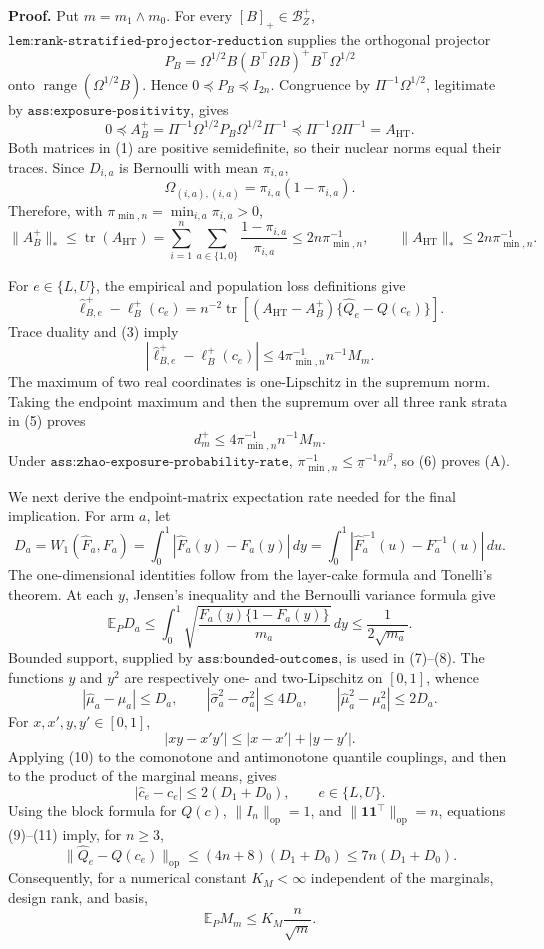\textbf{Proof.}
Put \(m=m_1\wedge m_0\).  For every \([B]_+\in\mathcal B_Z^+\), \(\texttt{lem:rank-stratified-projector-reduction}\) supplies the orthogonal projector
\[
P_B=\Omega^{1/2}B(B^{\top}\Omega B)^+B^{\top}\Omega^{1/2}
\]
onto \(\operatorname{range}(\Omega^{1/2}B)\).  Hence \(0\preceq P_B\preceq I_{2n}\).  Congruence by \(\Pi^{-1}\Omega^{1/2}\), legitimate by \(\texttt{ass:exposure-positivity}\), gives
\[
0\preceq
A_B^+=\Pi^{-1}\Omega^{1/2}P_B\Omega^{1/2}\Pi^{-1}
\preceq
\Pi^{-1}\Omega\Pi^{-1}=A_{\mathrm{HT}}.
\tag{1}
\]
Both matrices in (1) are positive semidefinite, so their nuclear norms equal their traces.  Since \(D_{i,a}\) is Bernoulli with mean \(\pi_{i,a}\),
\[
\Omega_{(i,a),(i,a)}=\pi_{i,a}(1-\pi_{i,a}).
\tag{2}
\]
Therefore, with \(\pi_{\min,n}=\min_{i,a}\pi_{i,a}>0\),
\[
\lVert A_B^+\rVert_*
\le\operatorname{tr}(A_{\mathrm{HT}})
=\sum_{i=1}^n\sum_{a\in\{1,0\}}
\frac{1-\pi_{i,a}}{\pi_{i,a}}
\le2n\pi_{\min,n}^{-1},
\qquad
\lVert A_{\mathrm{HT}}\rVert_*
\le2n\pi_{\min,n}^{-1}.
\tag{3}
\]

For \(e\in\{L,U\}\), the empirical and population loss definitions give
\[
\widehat\ell_{B,e}^+-\ell_B^+(c_e)
=n^{-2}\operatorname{tr}\!\left[
(A_{\mathrm{HT}}-A_B^+)\{\widehat Q_e-Q(c_e)\}
\right].
\tag{4}
\]
Trace duality and (3) imply
\[
\left|\widehat\ell_{B,e}^+-\ell_B^+(c_e)\right|
\le4\pi_{\min,n}^{-1}n^{-1}M_m.
\tag{5}
\]
The maximum of two real coordinates is one-Lipschitz in the supremum norm.  Taking the endpoint maximum and then the supremum over all three rank strata in (5) proves
\[
d_m^+\le4\pi_{\min,n}^{-1}n^{-1}M_m.
\tag{6}
\]
Under \(\texttt{ass:zhao-exposure-probability-rate}\),
\(\pi_{\min,n}^{-1}\le\underline\pi^{-1}n^\beta\), so (6) proves (A).

We next derive the endpoint-matrix expectation rate needed for the final implication.  For arm \(a\), let
\[
D_a=W_1(\widehat F_a,F_a)
=\int_0^1|\widehat F_a(y)-F_a(y)|\,dy
=\int_0^1|\widehat F_a^{-1}(u)-F_a^{-1}(u)|\,du.
\tag{7}
\]
The one-dimensional identities follow from the layer-cake formula and Tonelli's theorem.  At each \(y\), Jensen's inequality and the Bernoulli variance formula give
\[
\mathbb E_P D_a
\le\int_0^1\sqrt{\frac{F_a(y)\{1-F_a(y)\}}{m_a}}\,dy
\le\frac{1}{2\sqrt{m_a}}.
\tag{8}
\]
Bounded support, supplied by \(\texttt{ass:bounded-outcomes}\), is used in (7)--(8).  The functions \(y\) and \(y^2\) are respectively one- and two-Lipschitz on \([0,1]\), whence
\[
|\widehat\mu_a-\mu_a|\le D_a,
\qquad
|\widehat\sigma_a^2-\sigma_a^2|\le4D_a,
\qquad
|\widehat\mu_a^2-\mu_a^2|\le2D_a.
\tag{9}
\]
For \(x,x',y,y'\in[0,1]\),
\[
|xy-x'y'|\le|x-x'|+|y-y'|.
\tag{10}
\]
Applying (10) to the comonotone and antimonotone quantile couplings, and then to the product of the marginal means, gives
\[
|\widehat c_e-c_e|\le2(D_1+D_0),
\qquad e\in\{L,U\}.
\tag{11}
\]
Using the block formula for \(Q(c)\), \(\lVert I_n\rVert_{\mathrm{op}}=1\), and \(\lVert\mathbf1\mathbf1^{\top}\rVert_{\mathrm{op}}=n\), equations (9)--(11) imply, for \(n\ge3\),
\[
\lVert\widehat Q_e-Q(c_e)\rVert_{\mathrm{op}}
\le(4n+8)(D_1+D_0)
\le7n(D_1+D_0).
\tag{12}
\]
Consequently, for a numerical constant \(K_M<\infty\) independent of the marginals, design rank, and basis,
\[
\mathbb E_PM_m\le K_M\frac{n}{\sqrt m}.
\tag{13}
\]

